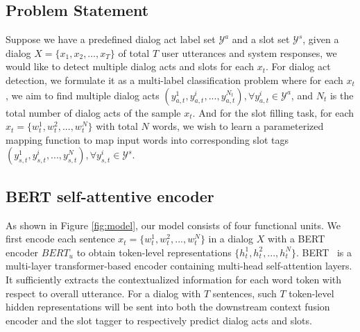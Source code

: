 \documentclass[a4paper]{article}
\begin{document}
\subsection{Problem Statement}

Suppose we have a predefined dialog act label set $\mathcal{Y}^a$ and a slot set $\mathcal{Y}^s$, given a dialog $X = \{x_1, x_2, \dots, x_T\}$ of total $T$ user utterances and system responses, we would like to detect multiple dialog acts and slots for each $x_t$. For dialog act detection, we formulate it as a multi-label classification problem where for each $x_t$, we aim to find multiple dialog acts $(y_{a,t}^1, y_{a,t}^i,...,y_{a,t}^{N_t}), \forall y_{a,t}^i \in \mathcal{Y}^a$, and $N_t$ is the total number of dialog acts of the sample $x_t$. And for the slot filling task, for each $x_t = \{w_t^1, w_t^2, ..., w_t^N\}$ with total $N$ words, we wish to learn a parameterized mapping function to map input words into corresponding slot tags $(y_{s,t}^1, y_{s,t}^i,...,y_{s,t}^N), \forall y_{s,t}^i \in \mathcal{Y}^s$.

\subsection{BERT self-attentive encoder}

As shown in Figure \ref{fig:model}, our model consists of four functional units. We first encode each sentence $x_t = \{w_t^1, w_t^2, ..., w_t^N\}$ in a dialog $X$ with a BERT encoder $BERT_u$ to obtain token-level representations $\{h_t^1, h_t^2, ..., h_t^N\}$. BERT~\cite{devlin2019bert} is a multi-layer transformer-based encoder containing multi-head self-attention layers. It sufficiently extracts the contextualized information for each word token with respect to overall utterance. For a dialog with $T$ sentences, such $T$ token-level hidden representations will be sent into both the downstream context fusion encoder and the slot tagger to respectively predict dialog acts and slots. 
\end{document}
